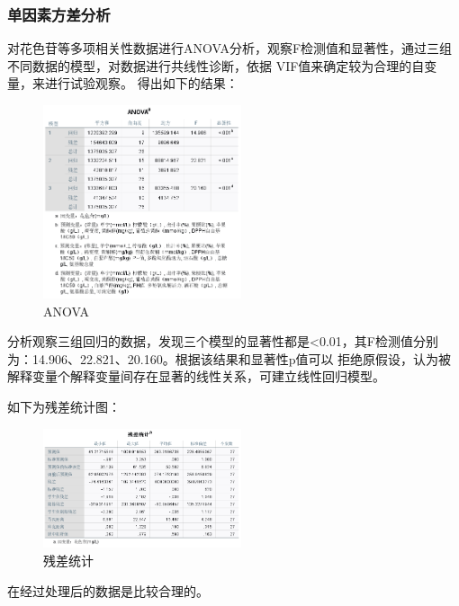 \documentclass[UTF8]{ctexart}
\begin{document}
					   \subsubsection{单因素方差分析}
					   		对花色苷等多项相关性数据进行ANOVA分析，观察F检测值和显著性，通过三组不同数据的模型，对数据进行共线性诊断，依据
							VIF值来确定较为合理的自变量，来进行试验观察。
							得出如下的结果：				
							\begin{figure}[H]\centering
								
								\includegraphics[width=0.52\textwidth,height=0.45\textwidth]{img/ANOVA.png} %
								
								\caption{ANOVA} %
								\label{fig:figure 5} %
								\end{figure}

							分析观察三组回归的数据，发现三个模型的显著性都是<0.01，其F检测值分别为：14.906、22.821、20.160。根据该结果和显著性p值可以
							拒绝原假设，认为被解释变量个解释变量间存在显著的线性关系，可建立线性回归模型。
							
							如下为残差统计图：
							\begin{figure}[H]\centering
								\includegraphics[width=0.52\textwidth,height=0.45\textwidth]{img/残差统计.png} %
								\caption{残差统计} %
								\label{fig:figure 6} %
								\end{figure}
								在经过处理后的数据是比较合理的。
\end{document}
